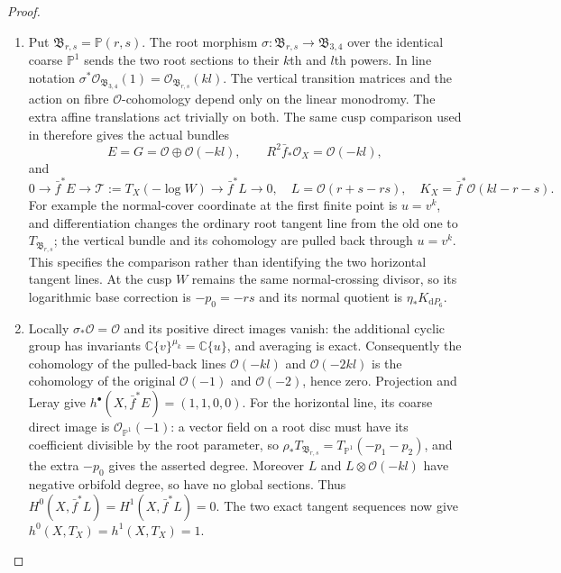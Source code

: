\begin{proof}

\begin{enumerate}[label={$\langle1\rangle$\arabic*.},leftmargin=*]
\item Put $\mathfrak B_{r,s}=\mathbb P(r,s)$. The root morphism
$\sigma:\mathfrak B_{r,s}\to\mathfrak B_{3,4}$ over the identical
coarse $\mathbb P^1$ sends the two root sections to their $k$th and
$l$th powers. In line notation
$\sigma^*\mathcal O_{\mathfrak B_{3,4}}(1)
=\mathcal O_{\mathfrak B_{r,s}}(kl)$.
The vertical transition matrices and the action on fibre
$\mathcal O$-cohomology depend only on the linear monodromy.
The extra affine translations act trivially on both. The same
cusp comparison used in  therefore gives the actual bundles
\[
 E=G=\mathcal O\oplus\mathcal O(-kl),\qquad
 R^2\bar f_*\mathcal O_X=\mathcal O(-kl),
\]
and
\[
0\to\bar f^*E\to\mathcal T:=T_X(-\log W)
 \to\bar f^*L\to0,
\quad L=\mathcal O(r+s-rs),
\quad K_X=\bar f^*\mathcal O(kl-r-s).
\]
For example the normal-cover coordinate at the first finite point
is $u=v^k$, and differentiation changes the ordinary root tangent
line from the old one to $T_{\mathfrak B_{r,s}}$; the vertical
bundle and its cohomology are pulled back through $u=v^k$.
This specifies the comparison rather than identifying the two
horizontal tangent lines. At the cusp $W$ remains the same
normal-crossing divisor, so its logarithmic base correction is
$-p_0=-rs$ and its normal quotient is $\eta_*K_{\mathrm dP_6}$.

\item Locally $\sigma_*\mathcal O=\mathcal O$ and its positive direct
images vanish: the additional cyclic group has invariants
$\mathbb C\{v\}^{\mu_k}=\mathbb C\{u\}$, and averaging is
exact. Consequently the cohomology of the pulled-back lines
$\mathcal O(-kl)$ and $\mathcal O(-2kl)$ is the cohomology of
the original $\mathcal O(-1)$ and $\mathcal O(-2)$, hence zero.
Projection and Leray give
$h^\bullet(X,\bar f^*E)=(1,1,0,0)$.
For the horizontal line, its coarse direct image is
$\mathcal O_{\mathbb P^1}(-1)$: a vector field on a root disc
must have its coefficient divisible by the root parameter,
so $\rho_*T_{\mathfrak B_{r,s}}=T_{\mathbb P^1}(-p_1-p_2)$,
and the extra $-p_0$ gives the asserted degree. Moreover
$L$ and $L\otimes\mathcal O(-kl)$ have negative orbifold degree,
so have no global sections. Thus
$H^0(X,\bar f^*L)=H^1(X,\bar f^*L)=0$.
The two exact tangent sequences now give
$h^0(X,T_X)=h^1(X,T_X)=1$.


\end{enumerate}
\end{proof}
